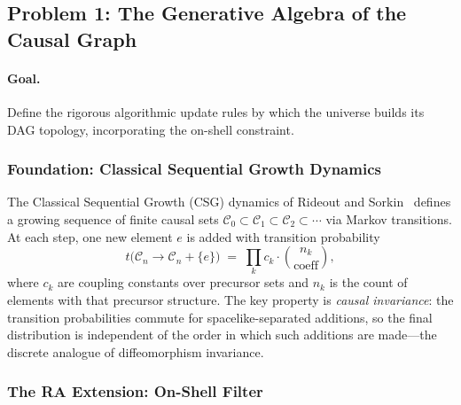 \documentclass[11pt,a4paper]{article}
\theoremstyle{plain}
\theoremstyle{definition}
\theoremstyle{remark}
\begin{document}
\subsection{Problem 1: The Generative Algebra of the Causal Graph}
\label{sec:algebra}

\paragraph{Goal.} Define the rigorous algorithmic update rules by which the
universe builds its DAG topology, incorporating the on-shell constraint.

\subsubsection{Foundation: Classical Sequential Growth Dynamics}

The Classical Sequential Growth (CSG) dynamics of Rideout and
Sorkin~\citep{RideoutSorkin2000} defines a growing sequence of finite causal sets
$\mathcal{C}_{0} \subset \mathcal{C}_{1} \subset \mathcal{C}_{2} \subset \cdots$
via Markov transitions. At each step, one new element $e$ is added with transition
probability
\begin{equation}
  t\bigl(\mathcal{C}_{n} \to \mathcal{C}_{n} + \{e\}\bigr)
  \;=\;
  \prod_{k} c_{k} \cdot \binom{n_{k}}{\text{coeff}},
  \label{eq:amplitude}
\end{equation}
where $c_{k}$ are coupling constants over precursor sets and $n_{k}$ is the count
of elements with that precursor structure. The key property is \emph{causal
invariance}: the transition probabilities commute for spacelike-separated
additions, so the final distribution is independent of the order in which such
additions are made---the discrete analogue of diffeomorphism invariance.

\subsubsection{The RA Extension: On-Shell Filter}
\end{document}
